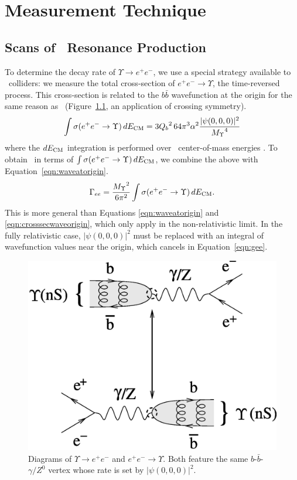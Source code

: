 \documentclass{cornell}
\begin{document}
\chapter{Measurement Technique}
\label{chp:technique}

\section{Scans of \boldmath \ups\ Resonance Production}

To determine the decay rate of $\Upsilon \to e^+e^-$, we use a special
strategy available to \ee\ colliders: we measure the total
cross-section of $e^+e^- \to \Upsilon$, the time-reversed process.
This cross-section is related to the $b\bar{b}$ wavefunction at the
origin for the same reason as \gee\ (Figure~\ref{timereversed}, an
application of crossing symmetry).
\begin{equation}
  \int \sigma(e^+e^- \to \Upsilon) \, dE_{\mbox{\scriptsize CM}} = 3{Q_b}^2 \, 64
  \pi^3 \alpha^2 \frac{|\psi(0,0,0)|^2}{{M_\Upsilon}^4}
  \label{eqn:crosssecwaveorigin}
\end{equation}
where the $dE_{\mbox{\scriptsize CM}}$ integration is performed over \ee\
center-of-mass energies \cite{ps}.  To obtain \gee\ in terms of $\int
\sigma(e^+e^- \to \Upsilon) \, dE_{\mbox{\scriptsize CM}}$, we combine the above
with Equation~\ref{eqn:waveatorigin}.
\begin{equation}
  \Gamma_{ee} = \frac{{M_\Upsilon}^2}{6\pi^2} \int \sigma(e^+e^- \to
  \Upsilon) \, dE_{\mbox{\scriptsize CM}} \mbox{.}
  \label{eqn:gee}
\end{equation}
This is more general than Equations \ref{eqn:waveatorigin} and
\ref{eqn:crosssecwaveorigin}, which only apply in the non-relativistic
limit.  In the fully relativistic case, $|\psi(0,0,0)|^2$ must be
replaced with an integral of wavefunction values near the origin,
which cancels in Equation~\ref{eqn:gee}.

\begin{figure}[p]
  \begin{center}
    \includegraphics[width=0.6\linewidth]{timereversed}
  \end{center}
  \caption[Diagrams of $\Upsilon \to e^+e^-$ and $e^+e^- \to
  \Upsilon$]{\label{timereversed} Diagrams of $\Upsilon \to e^+e^-$
  and $e^+e^- \to \Upsilon$.  Both feature the same
  $b$-$\bar{b}$-$\gamma/Z^0$ vertex whose rate is set by
  $|\psi(0,0,0)|^2$.}
\end{figure}
\end{document}
